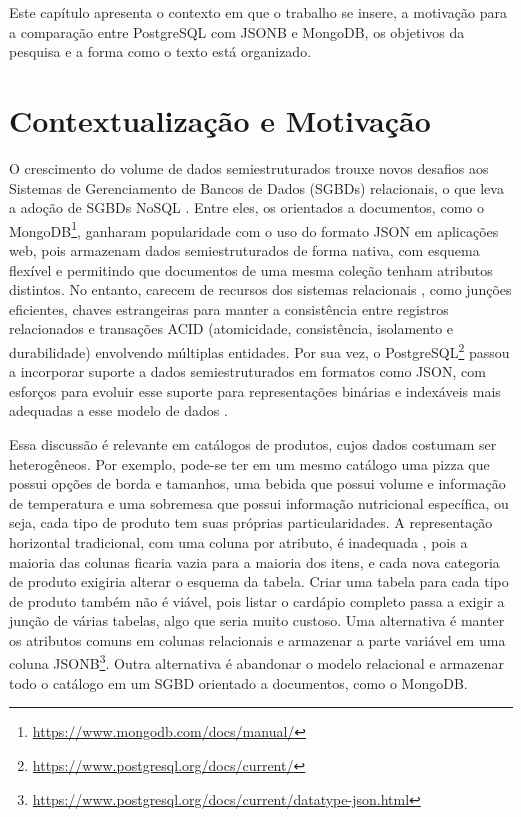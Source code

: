 
Este capítulo apresenta o contexto em que o trabalho se insere, a motivação para a comparação entre PostgreSQL com JSONB e MongoDB, os objetivos da pesquisa e a forma como o texto está organizado.

\section{Contextualização e Motivação}
O crescimento do volume de dados semiestruturados trouxe novos desafios
aos Sistemas de Gerenciamento de Bancos de Dados (SGBDs) relacionais, o que leva a
adoção de SGBDs NoSQL \cite{Eldahshan2022}. Entre eles, os orientados a documentos,
como o MongoDB\footnote{\url{https://www.mongodb.com/docs/manual/}}, ganharam popularidade com o uso do formato JSON em aplicações web, 
pois armazenam dados semiestruturados de forma nativa, com esquema flexível e permitindo que documentos de uma mesma coleção tenham 
atributos distintos. 
No entanto, carecem de recursos dos sistemas relacionais \cite{Chasseur2013}, como junções eficientes, 
chaves estrangeiras para manter a consistência entre registros relacionados e transações ACID (atomicidade, consistência, isolamento e durabilidade) envolvendo múltiplas entidades.
Por sua vez, o PostgreSQL\footnote{\url{https://www.postgresql.org/docs/current/}} passou a incorporar suporte a dados
semiestruturados em formatos como JSON, com esforços para evoluir esse suporte
para representações binárias e indexáveis mais adequadas a esse modelo de dados
\cite{Bartunov2013}.

Essa discussão é relevante em catálogos de produtos, cujos dados costumam ser heterogêneos. 
Por exemplo, pode-se ter em um mesmo catálogo uma pizza que possui opções de borda e tamanhos, 
uma bebida que possui volume e informação de temperatura e uma sobremesa que possui informação nutricional específica, 
ou seja, cada tipo de produto tem suas próprias
particularidades. A representação horizontal
tradicional, com uma coluna por atributo, é inadequada \cite{Agrawal2001}, pois a maioria das
colunas ficaria vazia para a maioria dos itens, e cada nova categoria de produto exigiria
alterar o esquema da tabela. Criar uma tabela para cada tipo de produto também não é viável,
pois listar o cardápio completo passa a exigir a junção de várias tabelas, algo que seria muito custoso.
Uma alternativa é manter os atributos comuns em colunas relacionais e armazenar a parte variável em uma coluna JSONB\footnote{\url{https://www.postgresql.org/docs/current/datatype-json.html}}.
Outra alternativa é abandonar o modelo relacional e armazenar todo o catálogo em um SGBD orientado a documentos, como o MongoDB.


